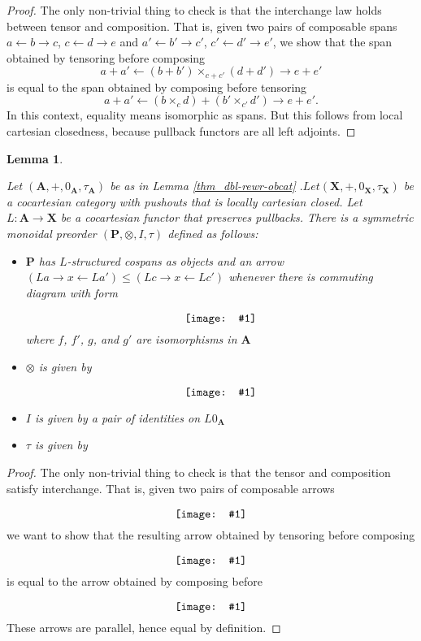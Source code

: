 \documentclass{amsart}
\newcommand{\A}{\cat{A}}
\renewcommand{\P}{\cat{P}}
\newcommand{\X}{\cat{X}}
\newcommand{\cat}[1]{\mathbf{#1}}
\newcommand{\from}{\colon}
\newcommand{\diagram}[1]{\raisebox{-0.5\height}{\texttt{[image: \#1]}}}
\newtheorem{lemma}[theorem]{Lemma}
\theoremstyle{remark}
\theoremstyle{definition}
\begin{document}
\begin{proof}
  
  The only non-trivial thing to check is that the interchange law
  holds between tensor and composition.  That is, given two pairs of
  composable spans $ a \gets b \to c $, $ c \gets d \to e $ and
  $ a' \gets b' \to c' $, $ c' \gets d' \to e' $, we show that the
  span obtained by tensoring before composing
  \[
    a + a' \gets (b + b') \times_{c + c'} (d + d') \to e + e'
  \]
  is equal to the span obtained by composing before tensoring
  \[
    a + a' \gets (b \times_{c} d) + (b' \times_{c'} d') \to e + e'.
  \]
  In this context, equality means isomorphic as spans. But this
  follows from local cartesian closedness, because pullback functors
  are all left adjoints.
  
\end{proof}

\begin{lemma} \label{thm:dlb-rewr-arrcat}
  
  Let $ (\A , + , 0_\A , \tau_\A ) $ be as in Lemma
  \ref{thm_dbl-rewr-obcat} $. Let (\X , + , 0_\X , \tau_\X ) $ be a
  cocartesian category with pushouts that is locally cartesian
  closed. Let $ L \from \A \to \X $ be a cocartesian functor that
  preserves pullbacks. There is a symmetric monoidal preorder
  $ (\P , \otimes , I , \tau ) $ defined as follows:
  
  \begin{itemize}
  \item $ \P $ has $ L $-structured cospans as objects and an arrow
    $ (L a \to x \gets L a') \leq (L c \to x \gets L c') $ whenever
    there is commuting diagram with form
      \[
        \diagram{diag_nlr_dbl-rewrite-2cell}
      \]
      where $ f $, $ f' $, $ g $, and $ g' $ are isomorphisms in $ \A $
    \item $ \otimes $ is given by
       \[
         \diagram{diag_nlr_dbl-rewrite-tensor}
       \]
    \item $ I $ is given by a pair of identities on $ L0_{\A} $
    \item $ \tau $ is given by
      \begin{center}
	\diagram{diag_nlr_dbl-rewrite-braiding}
      \end{center}
    \end{itemize}
    
\end{lemma}
  
\begin{proof}
  
  The only non-trivial thing to check is that the tensor and
  composition satisfy interchange. That is, given two pairs of
  composable arrows
  \[
    \diagram{diag_nlr_preorder-interchange}
  \]
  we want to show that the resulting arrow obtained by tensoring before composing
  \[
    \diagram{diag_nlr_preorder-tensor-compose}
  \]
  is equal to the arrow obtained by composing before
  \[
    \diagram{diag_nlr_preorder-compose-tensor}
  \]
  These arrows are parallel, hence equal by definition.
  
\end{proof}
\end{document}
